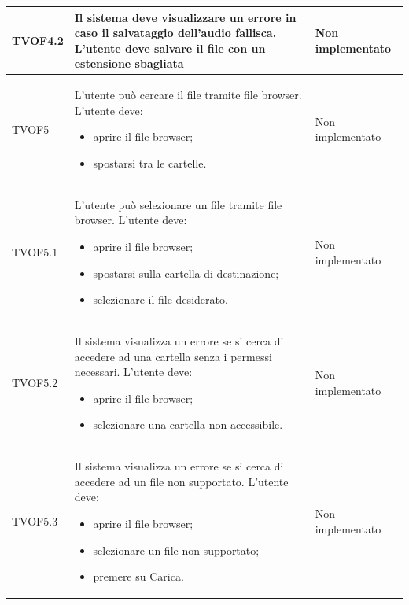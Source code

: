 \documentclass[openany,12pt,a4paper]{report}
\begin{document}
\begin{longtable}{| p{2cm} |p{5cm} | p{2.5cm} |}
	\hline
	\newline TVOF4.2&
	\newline Il sistema deve visualizzare un errore in caso il salvataggio dell'audio fallisca. L'utente deve salvare il file con un estensione sbagliata&
	\newline Non implementato
	\\[1em]
	\hline
	
	\newline TVOF5&
	\newline L'utente può cercare il file tramite file browser. L'utente deve:
	\begin{itemize}
		\item aprire il file browser;
		\item spostarsi tra le cartelle.
	\end{itemize}&
	\newline Non implementato
	\\[1em]
	\hline
	
	\newline TVOF5.1&
	\newline L'utente può selezionare un file tramite file browser. L'utente deve:
	\begin{itemize}
		\item aprire il file browser;
		\item spostarsi sulla cartella di destinazione;
		\item selezionare il file desiderato.
	\end{itemize}&
	\newline Non implementato
	\\[1em]	
	\hline
	
	\newline TVOF5.2&
	\newline Il sistema visualizza un errore se si cerca di accedere ad una cartella senza i permessi necessari. L'utente deve:
	\begin{itemize}
		\item aprire il file browser;
		\item selezionare una cartella non accessibile.
	\end{itemize}&
	\newline Non implementato
	\\[1em]	
	\hline
	
	\newline TVOF5.3&
	\newline Il sistema visualizza un errore se si cerca di accedere ad un file non supportato. L'utente deve:
	\begin{itemize}
		\item aprire il file browser;
		\item selezionare un file non supportato;
		\item premere su Carica.
	\end{itemize}&
	\newline Non implementato
	\\[1em]	
	\hline
	

\end{longtable}
\end{document}

